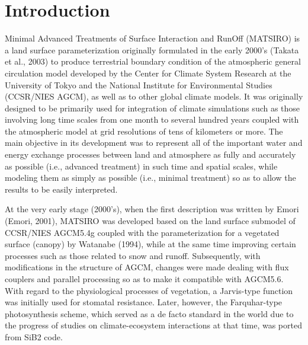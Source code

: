 \hypertarget{introduction}{%
\section{Introduction}\label{introduction}}

Minimal Advanced Treatments of Surface Interaction and RunOff (MATSIRO) is a land surface parameterization originally formulated in the early 2000's (Takata et al., 2003) to produce terrestrial
boundary condition of the atmospheric general circulation model developed by the Center for Climate System Research at the University of Tokyo and the National Institute for Environmental Studies
(CCSR/NIES AGCM), as well as to other global climate models. It was originally designed to be primarily used for integration of climate simulations such as those involving long time scales from one
month to several hundred years coupled with the atmospheric model at grid resolutions of tens of kilometers or more. The main objective in its development was to represent all of the important water
and energy exchange processes between land and atmosphere as fully and accurately as possible (i.e., advanced treatment) in such time and spatial scales, while modeling them as simply as possible
(i.e., minimal treatment) so as to allow the results to be easily interpreted.

At the very early stage (2000's), when the first description was written by Emori (Emori, 2001), MATSIRO was developed based on the land surface submodel of CCSR/NIES AGCM5.4g coupled with the
parameterization for a vegetated surface (canopy) by Watanabe (1994), while at the same time improving certain processes such as those related to snow and runoff. Subsequently, with modifications in
the structure of AGCM, changes were made dealing with flux couplers and parallel processing so as to make it compatible with AGCM5.6. With regard to the physiological processes of vegetation, a
Jarvis-type function was initially used for stomatal resistance. Later, however, the Farquhar-type photosynthesis scheme, which served as a de facto standard in the world due to the progress of
studies on climate-ecosystem interactions at that time, was ported from SiB2 code.

